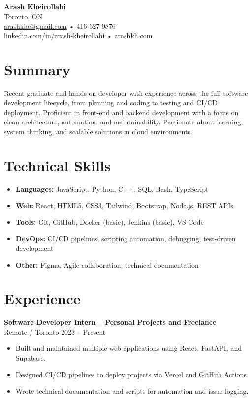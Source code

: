 \documentclass[letterpaper,11pt]{article}
\begin{document}

{\LARGE \textbf{Arash Kheirollahi}}\\[0.2em]
Toronto, ON \\
\href{mailto:arashkhe@gmail.com}{arashkhe@gmail.com} • 416-627-9876 \\
\href{https://linkedin.com/in/arash-kheirollahi}{linkedin.com/in/arash-kheirollahi} • \href{https://arashkh.com}{arashkh.com}

\vspace{0.8em}

\section*{Summary}
Recent graduate and hands-on developer with experience across the full software development lifecycle, from planning and coding to testing and CI/CD deployment. Proficient in front-end and backend development with a focus on clean architecture, automation, and maintainability. Passionate about learning, system thinking, and scalable solutions in cloud environments.

\section*{Technical Skills}
\begin{itemize}[leftmargin=*]
  \item \textbf{Languages:} JavaScript, Python, C++, SQL, Bash, TypeScript
  \item \textbf{Web:} React, HTML5, CSS3, Tailwind, Bootstrap, Node.js, REST APIs
  \item \textbf{Tools:} Git, GitHub, Docker (basic), Jenkins (basic), VS Code
  \item \textbf{DevOps:} CI/CD pipelines, scripting automation, debugging, test-driven development
  \item \textbf{Other:} Figma, Agile collaboration, technical documentation
\end{itemize}

\section*{Experience}
\textbf{Software Developer Intern – Personal Projects and Freelance}\\
Remote / Toronto \hfill 2023 -- Present
\begin{itemize}[leftmargin=*]
  \item Built and maintained multiple web applications using React, FastAPI, and Supabase.
  \item Designed CI/CD pipelines to deploy projects via Vercel and GitHub Actions.
  \item Wrote technical documentation and scripts for automation and issue logging.
\end{itemize}
\end{document}
